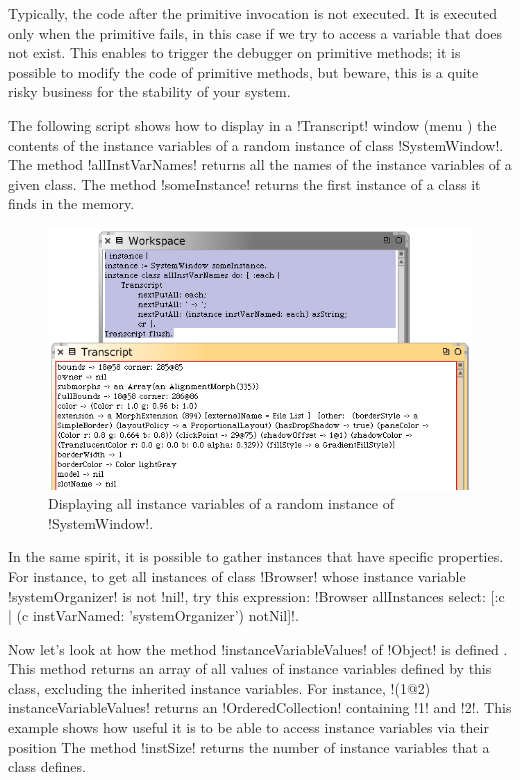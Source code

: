 \documentclass[a4paper,10pt,twoside]{book}
\begin{document}
Typically, the code after the primitive invocation is not executed.
It is executed only when the primitive fails, \eg in this case if we try to access a variable that does not exist.
This enables to trigger the debugger on primitive methods; it is possible to modify the code of primitive methods, but beware, this is a quite risky business for the stability of your \sq system.

The following script shows how to display in a \ct!Transcript! window (menu ) the contents of the instance variables of a random instance of class \ct!SystemWindow!.
The method \ct!allInstVarNames! returns all the names of the instance variables of a given class.
The method \ct!someInstance! returns the first instance of a class it finds in the memory.

\begin{figure}[ht]\centering
	\includegraphics[width=.75\linewidth]{allInstanceVariables}
	\caption{Displaying all instance variables of a random instance of \ct!SystemWindow!.\label{fig:allInstanceVariables}}
\end{figure}

In the same spirit, it is possible to gather instances that have specific properties.
For instance, to get all instances of class \ct!Browser! whose instance variable \ct!systemOrganizer! is not \ct!nil!, try this expression: \ct!Browser allInstances select: [:c | (c instVarNamed: 'systemOrganizer') notNil]!.

Now let's look  at how the method \ct!instanceVariableValues! of \ct!Object! is defined . This method returns an array of all values of instance variables defined by this class, excluding the inherited instance variables.
For instance, \ct!(1@2) instanceVariableValues! returns an \ct!OrderedCollection! containing \ct!1! and \ct!2!.
This example shows how useful it is to be able to access instance variables via their position 
The method \ct!instSize! returns the number of instance variables that a class defines.
\end{document}
